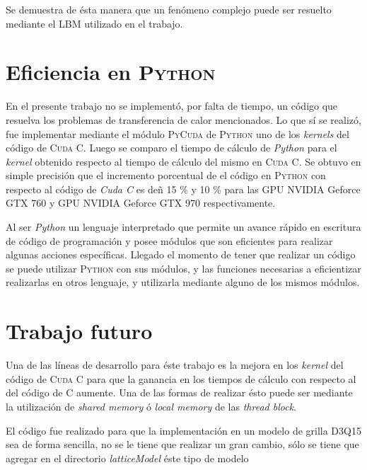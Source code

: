 Se demuestra de ésta manera que un fenómeno complejo puede ser resuelto mediante el LBM utilizado en el trabajo.

\section{Eficiencia en \textsc{Python}}

En el presente trabajo no se implementó, por falta de tiempo, un código que resuelva los problemas de transferencia de calor mencionados. Lo que sí se realizó, fue implementar mediante el módulo \textsc{PyCuda} de \textsc{Python} uno de los \textit{kernels} del código de \textsc{Cuda C}. Luego se comparo el tiempo de cálculo de \textit{Python} para el \textit{kernel} obtenido respecto al tiempo de cálculo del mismo en \textsc{Cuda C}. Se obtuvo en simple precisión que el incremento porcentual de el código en \textsc{Python} con respecto al código de \textit{Cuda C} es deñ 15 \% y 10 \% para las GPU NVIDIA Geforce GTX 760 y GPU NVIDIA Geforce GTX 970 respectivamente.

Al ser \textit{Python} un lenguaje interpretado que permite un avance rápido en escritura de código de programación y posee módulos que son eficientes para realizar algunas acciones específicas. Llegado el momento de tener que realizar un código se puede utilizar \textsc{Python} con sus módulos, y las funciones necesarias a eficientizar realizarlas en otros lenguaje, y utilizarla mediante alguno de los mismos módulos.


\section{Trabajo futuro}

Una de las líneas de desarrollo para éste trabajo es la mejora en los \textit{kernel} del código de \textsc{Cuda C} para que la ganancia en los tiempos de cálculo con respecto al del código de \textsc{C} aumente. Una de las formas de realizar ésto puede ser mediante la utilización de \textit{shared memory} ó \textit{local memory} de las \textit{thread block}. 

El código fue realizado para que la implementación en un modelo de grilla D3Q15 sea de forma sencilla, no se le tiene que realizar un gran cambio, sólo se tiene que agregar en el directorio \textit{latticeModel} éste tipo de modelo 

%
%

